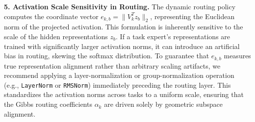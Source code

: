 \textbf{5. Activation Scale Sensitivity in Routing.}
The dynamic routing policy computes the coordinate vector $e_{k, b} = \|V_k^T z_b\|_2$, representing the Euclidean norm of the projected activation. This formulation is inherently sensitive to the scale of the hidden representations $z_b$. If a task expert's representations are trained with significantly larger activation norms, it can introduce an artificial bias in routing, skewing the softmax distribution. To guarantee that $e_{k, b}$ measures true representation alignment rather than arbitrary scaling artifacts, we recommend applying a layer-normalization or group-normalization operation (e.g., \texttt{LayerNorm} or \texttt{RMSNorm}) immediately preceding the routing layer. This standardizes the activation norms across tasks to a uniform scale, ensuring that the Gibbs routing coefficients $\alpha_k$ are driven solely by geometric subspace alignment.
